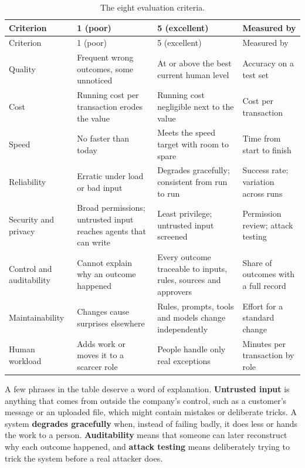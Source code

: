 \begingroup
\small
\begin{xltabular}{\textwidth}{@{}>{\raggedright\arraybackslash}p{2.4cm}>{\raggedright\arraybackslash}X>{\raggedright\arraybackslash}X>{\raggedright\arraybackslash}p{3.0cm}@{}}
\caption{The eight evaluation criteria.}\label{tab:criteria}\\
\toprule
{} Criterion & 1 (poor) & 5 (excellent) & Measured by \\
\midrule
\endfirsthead
\toprule
{} Criterion & 1 (poor) & 5 (excellent) & Measured by \\
\midrule
\endhead
Quality & Frequent wrong outcomes, some unnoticed & At or above the best current human level & Accuracy on a test set \\
Cost & Running cost per transaction erodes the value & Running cost negligible next to the value & Cost per transaction \\
Speed & No faster than today & Meets the speed target with room to spare & Time from start to finish \\
Reliability & Erratic under load or bad input & Degrades gracefully; consistent from run to run & Success rate; variation across runs \\
Security and privacy & Broad permissions; untrusted input reaches agents that can write & Least privilege; untrusted input screened & Permission review; attack testing \\
Control and auditability & Cannot explain why an outcome happened & Every outcome traceable to inputs, rules, sources and approvers & Share of outcomes with a full record \\
Maintainability & Changes cause surprises elsewhere & Rules, prompts, tools and models change independently & Effort for a standard change \\
Human workload & Adds work or moves it to a scarcer role & People handle only real exceptions & Minutes per transaction by role \\
\bottomrule
\end{xltabular}
\endgroup

A few phrases in the table deserve a word of explanation. \textbf{Untrusted input} is anything that comes from outside the company's control, such as a customer's message or an uploaded file, which might contain mistakes or deliberate tricks. A system \textbf{degrades gracefully} when, instead of failing badly, it does less or hands the work to a person. \textbf{Auditability} means that someone can later reconstruct why each outcome happened, and \textbf{attack testing} means deliberately trying to trick the system before a real attacker does.


